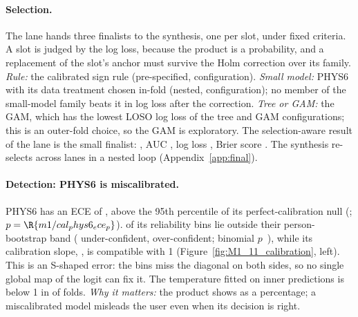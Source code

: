 \paragraph{Selection.} The lane hands three finalists to the synthesis, one per slot, under fixed
criteria. A slot is judged by the log loss, because the product is a probability, and a replacement
of the slot's anchor must survive the Holm correction over its family. \emph{Rule:} the calibrated
sign rule (pre-specified,  configuration). \emph{Small model:} PHYS6 with its
data treatment chosen in-fold (nested,  configuration); no member of the
small-model family beats it in log loss after the correction. \emph{Tree or GAM:} the GAM, which has
the lowest LOSO log loss of the  tree and GAM configurations; this is an
outer-fold choice, so the GAM is exploratory. The selection-aware result of the lane is the small
finalist: , AUC , log loss , Brier
score  \cite{brier1950verification}. The synthesis re-selects across lanes in a
nested loop (Appendix~\ref{app:final}).

\paragraph{Detection: PHYS6 is miscalibrated.} PHYS6 has an ECE of , above the
95th percentile of its perfect-calibration null (;
$p = \R{m1/cal_phys6_ece_p}$).  of its  reliability
bins lie outside their person-bootstrap band ( under-confident,
 over-confident; binomial $p$~), while its calibration slope,
, is compatible with 1 (Figure~\ref{fig:M1_11_calibration}, left). This
is an S-shaped error: the bins miss the diagonal on both sides, so no single global map of the logit
can fix it. The temperature fitted on inner predictions is below 1 in  of
 folds. \emph{Why it matters:} the product shows \pright{} as a percentage;
a miscalibrated model misleads the user even when its decision is right.

